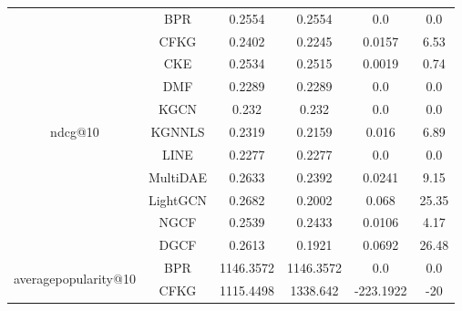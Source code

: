 \begin{table}[H]
{\begin{tabular}{|c|c|c|c|c|c|}
            \multirow{11}{*}{ndcg@10}   & BPR      & 0.2554                  & 0.2554                    & 0.0               & 0.0               \\ \cline{2-6}
                                         & CFKG     & 0.2402                  & 0.2245                    & 0.0157            & 6.53            \\ \cline{2-6}
                                         & CKE      & 0.2534                  & 0.2515                    & 0.0019            & 0.74            \\ \cline{2-6}
                                         & DMF      & 0.2289                  & 0.2289                    & 0.0               & 0.0               \\ \cline{2-6}
                                         & KGCN     & 0.232                   & 0.232                     & 0.0               & 0.0               \\ \cline{2-6}
                                         & KGNNLS   & 0.2319                  & 0.2159                    & 0.016             & 6.89            \\ \cline{2-6}
                                         & LINE     & 0.2277                  & 0.2277                    & 0.0               & 0.0               \\ \cline{2-6}
                                         & MultiDAE & 0.2633                  & 0.2392                    & 0.0241            & 9.15            \\ \cline{2-6}
                                         & LightGCN & 0.2682                  & 0.2002                    & 0.068             & 25.35           \\ \cline{2-6}
                                         & NGCF     & 0.2539                  & 0.2433                    & 0.0106            & 4.17            \\ \cline{2-6}
                                         & DGCF     & 0.2613                  & 0.1921                    & 0.0692            & 26.48            \\ \hline
            \multirow{11}{*}{averagepopularity@10} & BPR      & 1146.3572              & 1146.3572                 & 0.0               & 0.0               \\ \cline{2-6}
                                                     & CFKG     & 1115.4498              & 1338.642                  & -223.1922         & -20          \\ \cline{2-6}

\end{tabular}}
\end{table}
